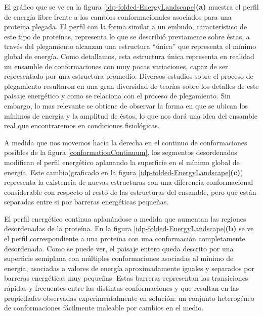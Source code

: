 El gráfico que se ve en la figura \ref{idp-folded-EnergyLandscape}\textbf{(a)} muestra el perfil de energía libre frente a los cambios conformacionales asociados para una proteína plegada.
El perfil con la forma similar a un embudo, característico de este tipo de proteínas, representa lo que se describió previamente sobre éstas, a través del plegamiento alcanzan una estructura ``única'' que 
representa el mínimo global de energía. 
Como detallamos, esta estructura única representa en realidad un ensamble de conformaciones con muy pocas variaciones, capaz de ser representado por una estructura promedio.
Diversos estudios sobre el proceso de plegamiento resultaron en una gran diversidad de teorías sobre los detalles de este paisaje energético y como se relaciona con el proceso de plegamiento.
Sin embargo, lo mas relevante se obtiene de observar la forma en que se ubican los mínimos de energía y la amplitud de éstos, lo que nos dará una idea del ensamble real que encontraremos en condiciones fisiológicas.

A medida que nos movemos hacia la derecha en el continuo de conformaciones posibles de la figura \ref{conformationContinuum}, los segmentos desordenados 
modifican el perfil energético aplanando la superficie en el mínimo global de energía. 
Este cambio(graficado en la figura \ref{idp-folded-EnergyLandscape}\textbf{(c)}) representa la existencia de nuevas estructuras con una diferencia conformacional considerable con respecto al resto de las estructuras del ensamble, 
pero que están separadas entre si por barreras energéticas pequeñas. 

El perfil energético continua aplanándose a medida que aumentan las regiones desordenadas de la proteína. En la figura \ref{idp-folded-EnergyLandscape}\textbf{(b)} se ve el perfil 
correspondiente a una proteína con una conformación completamente desordenada. 
Como se puede ver, el paisaje entero queda descrito por una superficie semiplana con múltiples conformaciones asociadas al mínimo de energía, 
asociadas a valores de energía aproximadamente iguales y separados por barreras energéticas muy pequeñas.
Estas barreras representan las transiciones rápidas y frecuentes entre las distintas conformaciones y que resultan en las propiedades observadas experimentalmente
en solución: un conjunto heterogéneo de conformaciones fácilmente maleable por cambios en el medio. 

